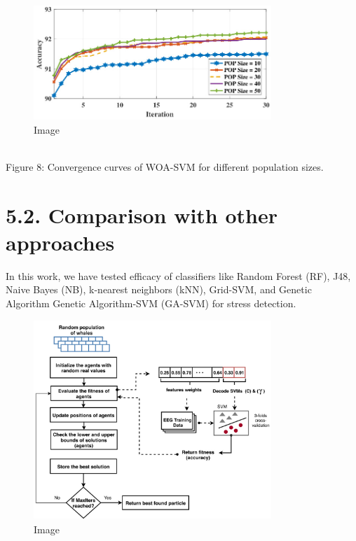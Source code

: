 \documentclass{article}
\begin{document}
\begin{figure}[htbp]
\centering
\includegraphics[width=0.8\textwidth]{images/43d14d83c76062f457f9dc0086d5e9adf103e161a24a04f5af03173f16073b4b.jpg}
\caption{Image}
\end{figure}

\\
Figure 8: Convergence curves of WOA-SVM for different population sizes.


\section{5.2. Comparison with other approaches}

In this work, we have tested efficacy of classifiers like Random Forest (RF), J48, Naive Bayes (NB), k-nearest neighbors (kNN), Grid-SVM, and Genetic Algorithm Genetic Algorithm-SVM (GA-SVM) for stress detection.


\begin{figure}[htbp]
\centering
\includegraphics[width=0.8\textwidth]{images/803c589ba4f13b47d3842e8dcc603380d2dd4363175f03a417f4b721e13f7b75.jpg}
\caption{Image}
\end{figure}
\end{document}
